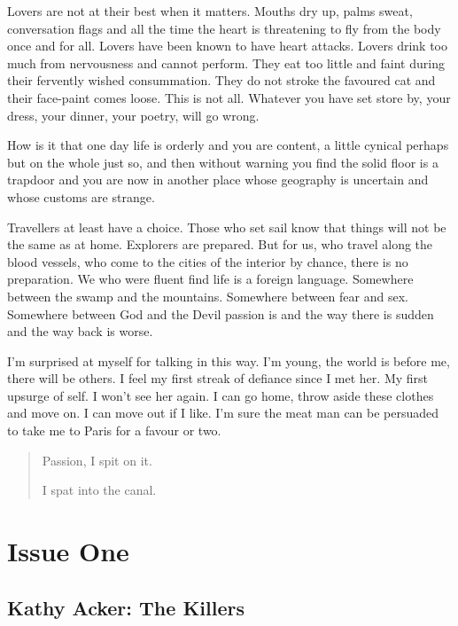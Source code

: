 \documentclass[
]{memoir}
\begin{document}
Lovers are not at their best when it matters. Mouths dry up, palms
sweat, conversation flags and all the time the heart is threatening to
fly from the body once and for all. Lovers have been known to have heart
attacks. Lovers drink too much from nervousness and cannot perform. They
eat too little and faint during their fervently wished consummation.
They do not stroke the favoured cat and their face-paint comes loose.
This is not all. Whatever you have set store by, your dress, your
dinner, your poetry, will go wrong.

How is it that one day life is orderly and you are content, a little
cynical perhaps but on the whole just so, and then without warning you
find the solid floor is a trapdoor and you are now in another place
whose geography is uncertain and whose customs are strange.

Travellers at least have a choice. Those who set sail know that things
will not be the same as at home. Explorers are prepared. But for us, who
travel along the blood vessels, who come to the cities of the interior
by chance, there is no preparation. We who were fluent find life is a
foreign language. Somewhere between the swamp and the mountains.
Somewhere between fear and sex. Somewhere between God and the Devil
passion is and the way there is sudden and the way back is worse.

I'm surprised at myself for talking in this way. I'm young, the world is
before me, there will be others. I feel my first streak of defiance
since I met her. My first upsurge of self. I won't see her again. I can
go home, throw aside these clothes and move on. I can move out if I
like. I'm sure the meat man can be persuaded to take me to Paris for a
favour or two.

\begin{quote}
Passion, I spit on it.

I spat into the canal.
\end{quote}

\mainmatter

\part*{Issue One}

\hypertarget{kathy-acker-the-killers}{%
\chapter{Kathy Acker: The Killers}\label{kathy-acker-the-killers}}
\end{document}
